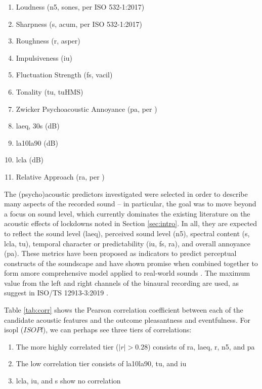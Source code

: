    \begin{enumerate}
     \item Loudness (\gls{n5}, sones, per ISO 532-1:2017)
     \item Sharpness (\gls{s}, acum, per ISO 532-1:2017)
     \item Roughness (\gls{r}, asper)
     \item Impulsiveness (\gls{iu})
     \item Fluctuation Strength (\gls{fs}, vacil)
     \item Tonality (\gls{tu}, tuHMS)
     \item Zwicker Psychoacoustic Annoyance (\gls{pa}, per \citet{PsychoacousticsZwicker})
     \item \gls{laeq}, 30s (dB)
     \item \gls{la10la90} (dB)
     \item \gls{lcla} (dB)
     \item Relative Approach (\gls{ra}, per \citet{Genuit1996Objective})
   \end{enumerate}

   The (psycho)acoustic predictors investigated were selected in order to describe many aspects of the recorded sound -- in particular, the goal was to move beyond a focus on sound level, which currently dominates the existing literature on the acoustic effects of lockdowns noted in Section \ref{sec:intro}. In all, they are expected to reflect the sound level (\gls{laeq}), perceived sound level (\gls{n5}), spectral content (\gls{s}, \gls{lcla}, \gls{tu}), temporal character or predictability (\gls{iu}, \gls{fs}, \gls{ra}), and overall annoyance (\gls{pa}). These metrics have been proposed as indicators to predict perceptual constructs of the soundscape \citep{Aletta2017Dimensions, Aletta2016Soundscape} and have shown promise when combined together to form amore comprehensive model applied to real-world sounds \citep{Orga2021Multilevel}. The maximum value from the left and right channels of the binaural recording are used, as suggest in ISO/TS 12913-3:2019 \citep{ISO12913_3_2019IOS}.

   Table \ref{tab:corr} shows the Pearson correlation coefficient between each of the candidate acoustic features and the outcome pleasantness and eventfulness. For \gls{isopl} ($ISOPl$), we can perhaps see three tiers of correlations:

   \begin{enumerate}
     \item The more highly correlated tier ($|r| > 0.28$) consists of \gls{ra}, \gls{laeq}, \gls{r}, \gls{n5}, and \gls{pa}
     \item The low correlation tier consists of \gls{la10la90}, \gls{tu}, and \gls{iu}
     \item \gls{lcla}, \gls{iu}, and \gls{s} show no correlation
   \end{enumerate}

